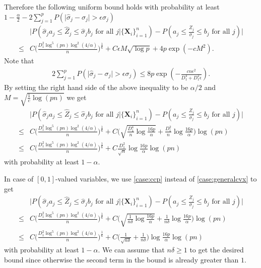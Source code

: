 \documentclass[mnsc,blindrev]{informs4} %
\begin{document}
Therefore the following uniform bound holds with probability at least $1-\frac{\alpha}{2}-2\sum_{j=1}^pP(\big\lvert\hat\sigma_j-\sigma_j\big\rvert> \epsilon\sigma_j)$
\begin{align*}
&\big\lvert P(\hat\sigma_ja_j\leq \widehat{Z}_j\leq\hat\sigma_j b_j\text{ for all }j\vert \{\mathbf X_i\}_{i=1}^n)-P(a_j\leq \frac{Z_j}{\sigma_j}\leq b_j\text{ for all }j)\big\rvert\\
\leq &C\Big(\frac{D_1^2\log^5(pn)\log^2(4/\alpha)}{n}\Big)^{\frac{1}{6}}+C\epsilon M\sqrt{\log p}+4p\exp(-cM^2).
\end{align*}
Note that
\begin{align*}
2\sum_{j=1}^pP(\big\lvert\hat\sigma_j-\sigma_j\big\rvert> \epsilon\sigma_j)\leq 8p\exp(-\frac{cn\epsilon^2}{D_1^4+D_1^2\epsilon}).
\end{align*}
By setting the right hand side of the above inequality to be $\alpha/2$ and $M=\sqrt{\frac{1}{c}\log(pn)}$ we get
\begin{align*}
&\big\lvert P(\hat\sigma_ja_j\leq \widehat{Z}_j\leq\hat\sigma_j b_j\text{ for all }j\vert \{\mathbf X_i\}_{i=1}^n)-P(a_j\leq \frac{Z_j}{\sigma_j}\leq b_j\text{ for all }j)\big\rvert\\
\leq &C\Big(\frac{D_1^2\log^5(pn)\log^2(4/\alpha)}{n}\Big)^{\frac{1}{6}}+C\Big(\sqrt{\frac{D_1^4}{n}\log\frac{16p}{\alpha}}+\frac{D_1^2}{n}\log\frac{16p}{\alpha}\Big)\log(pn)\\
\leq &C\Big(\frac{D_1^2\log^5(pn)\log^2(4/\alpha)}{n}\Big)^{\frac{1}{6}}+C\frac{D_1^2}{\sqrt{n}}\log\frac{16p}{\alpha}\log(pn)
\end{align*}
with probability at least $1-\alpha$.

In case of $[0,1]$-valued variables, we use \eqref{case:ccp} instead of \eqref{case:generalcvx} to get
\begin{align*}
&\big\lvert P(\hat\sigma_ja_j\leq \widehat{Z}_j\leq\hat\sigma_j b_j\text{ for all }j\vert \{\mathbf X_i\}_{i=1}^n)-P(a_j\leq \frac{Z_j}{\sigma_j}\leq b_j\text{ for all }j)\big\rvert\\
\leq &C\Big(\frac{D_1^2\log^5(pn)\log^2(4/\alpha)}{n}\Big)^{\frac{1}{6}}+C\Big(\sqrt{\frac{1}{n\delta}\log\frac{16p}{\alpha}}+\frac{1}{n\delta}\log\frac{16p}{\alpha}\Big)\log(pn)\\
\leq &C\Big(\frac{D_1^2\log^5(pn)\log^2(4/\alpha)}{n}\Big)^{\frac{1}{6}}+C\Big(\frac{1}{\sqrt{n\delta}}+\frac{1}{n\delta}\Big)\log\frac{16p}{\alpha}\log(pn)
\end{align*}
with probability at least $1-\alpha$. We can assume that $n\delta\geq 1$ to get the desired bound since otherwise the second term in the bound is already greater than $1$.\hfill\Halmos
\end{document}
